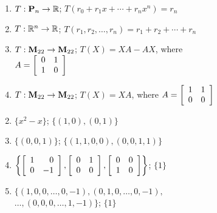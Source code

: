 \begin{multicols}{2}
\begin{ex}
\begin{enumerate}[label={\alph*.}]
\item $T : \textbf{P}_{n} \to \mathbb{R}$; $T(r_{0} + r_{1}x + \cdots + r_{n}x^{n}) = r_{n}$

\item $T : \mathbb{R}^n \to \mathbb{R}$; $T(r_{1}, r_{2}, \dots, r_{n}) = r_{1} + r_{2} + \cdots + r_{n}$

\item $T : \textbf{M}_{22} \to \textbf{M}_{22}$; $T(X) = XA - AX$, where \\ $A = \left[ \begin{array}{rr}
0 & 1 \\
1 & 0
\end{array} \right]$


\item $T : \textbf{M}_{22} \to \textbf{M}_{22}$; $T(X) = XA$, where $A = \left[ \begin{array}{rr}
1 & 1 \\
0 & 0
\end{array} \right]$


\end{enumerate}
\begin{sol}
\begin{enumerate}[label={\alph*.}]
\setcounter{enumi}{1}
\item $\{x^{2} - x\}$; $\{(1, 0), (0, 1)\}$

\setcounter{enumi}{3}
\item  $\{(0, 0, 1)\}$; $\{(1, 1, 0, 0), (0, 0, 1, 1)\}$

\setcounter{enumi}{5}
\item $\left\lbrace \left[ \begin{array}{rr}
1 & 0 \\
0 & -1
\end{array} \right], \left[ \begin{array}{rr}
0 & 1 \\
0 & 0
\end{array} \right], \left[ \begin{array}{rr}
0 & 0 \\
1 & 0
\end{array} \right] \right\rbrace$; $\{1\}$

\setcounter{enumi}{7}
\item $\{(1, 0, 0, \dots, 0, -1), (0, 1, 0, \dots, 0, -1),$ \\ $\dots, (0, 0, 0, \dots, 1, -1)\}$; $\{1\}$


\end{enumerate}
\end{sol}
\end{ex}
\end{multicols}
